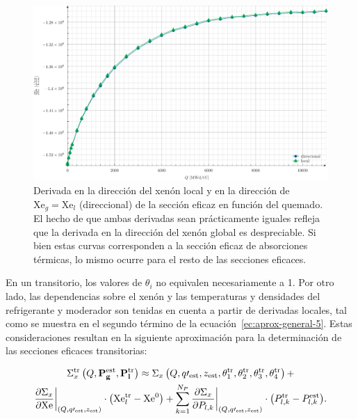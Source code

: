 \documentclass[11pt]{article}
\renewcommand{\vec}[1]{\ensuremath\mathbf{#1}}
\begin{document}
\begin{figure}[!h]
 \begin{center}
  \includegraphics[width=0.75\linewidth]{graficos/dependencia-dxs-xenon/dxs.pdf}
 \end{center}
\caption{\label{fig:dependencias-xenon} Derivada en la dirección del xenón local y en la dirección de $\text{Xe}_g = \text{Xe}_l$ (direccional) de la sección eficaz en función del quemado. El hecho de que ambas derivadas sean prácticamente iguales refleja que la derivada en la dirección del xenón global es despreciable. Si bien estas curvas corresponden a la sección eficaz de absorciones térmicas, lo mismo ocurre para el resto de las secciones eficaces.}
\end{figure}

En un transitorio, los valores de $\theta_i$ no equivalen necesariamente a \num{1}. Por otro lado, las dependencias sobre el xenón y las temperaturas y densidades del refrigerante y moderador son tenidas en cuenta a partir de derivadas locales, tal como se muestra en el segundo término de la ecuación~\ref{ec:aprox-general-5}. Estas consideraciones resultan en la siguiente aproximación para la determinación de las secciones eficaces transitorias:

\begin{multline} \label{ec:aprox-general-8}
 \Sigma^{\text{tr}}_x \left( Q, \vec{P^{\text{est}}_g}, \vec{P^{\text{tr}}_l} \right) \approx
 \Sigma_x \left( Q, q\prime_{\text{est}}, z_{\text{est}}, \theta^{\text{tr}}_1, \theta^{\text{tr}}_2, \theta^{\text{tr}}_3, \theta^{\text{tr}}_4 \right) + \\
 \frac{\partial\Sigma_x}{\partial \text{Xe}}\bigg|_{\left( Q, q\prime_{\text{est}}, z_{\text{est}} \right)} \cdot \left( \text{Xe}^{\text{tr}}_l - \text{Xe}^0 \right) +
 \sum_{k = 1}^{N_{P}}{\frac{\partial\Sigma_x}{\partial P_{l,k}}\bigg|_{\left( Q, q\prime_{\text{est}}, z_{\text{est}} \right)} \cdot \left(P^{\text{tr}}_{l,k} - P^{\text{est}}_{l,k} \right)}.
\end{multline}
\end{document}
